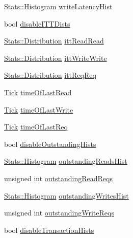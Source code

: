\begin{DoxyCompactItemize}
\item 
\hyperlink{classStats_1_1Histogram}{Stats::Histogram} \hyperlink{structCommMonitor_1_1MonitorStats_aae98c6b524c57e5bcbfdec4726032ba8}{writeLatencyHist}
\item 
bool \hyperlink{structCommMonitor_1_1MonitorStats_ad5c356c37130132a5d8a44e7020d7bb1}{disableITTDists}
\item 
\hyperlink{classStats_1_1Distribution}{Stats::Distribution} \hyperlink{structCommMonitor_1_1MonitorStats_a2898ccf55e5b25e410b8f90553212a71}{ittReadRead}
\item 
\hyperlink{classStats_1_1Distribution}{Stats::Distribution} \hyperlink{structCommMonitor_1_1MonitorStats_a6195d4cdad35fc6c4a2c2339ae3f633a}{ittWriteWrite}
\item 
\hyperlink{classStats_1_1Distribution}{Stats::Distribution} \hyperlink{structCommMonitor_1_1MonitorStats_a2534f8cd715e5bc6e07e14f9727428eb}{ittReqReq}
\item 
\hyperlink{base_2types_8hh_a5c8ed81b7d238c9083e1037ba6d61643}{Tick} \hyperlink{structCommMonitor_1_1MonitorStats_a6a581354c5e19eb4e16589d9806fef66}{timeOfLastRead}
\item 
\hyperlink{base_2types_8hh_a5c8ed81b7d238c9083e1037ba6d61643}{Tick} \hyperlink{structCommMonitor_1_1MonitorStats_a330664f7391bb348fd6f6e13d22aef26}{timeOfLastWrite}
\item 
\hyperlink{base_2types_8hh_a5c8ed81b7d238c9083e1037ba6d61643}{Tick} \hyperlink{structCommMonitor_1_1MonitorStats_a2f696df4ccf909e9eb168f897708cbbe}{timeOfLastReq}
\item 
bool \hyperlink{structCommMonitor_1_1MonitorStats_a58fa22f2c5716fcf2e67cfdfb9ccfb24}{disableOutstandingHists}
\item 
\hyperlink{classStats_1_1Histogram}{Stats::Histogram} \hyperlink{structCommMonitor_1_1MonitorStats_a16c997bc474fee7fff61f3716aa5792d}{outstandingReadsHist}
\item 
unsigned int \hyperlink{structCommMonitor_1_1MonitorStats_aa930889353c38227127f1f7a7945aa62}{outstandingReadReqs}
\item 
\hyperlink{classStats_1_1Histogram}{Stats::Histogram} \hyperlink{structCommMonitor_1_1MonitorStats_a4fef3195bdb93fcbb46f1bac89c3b2ef}{outstandingWritesHist}
\item 
unsigned int \hyperlink{structCommMonitor_1_1MonitorStats_ae09e25ada6f50f5e741ba4f7bd3de2ce}{outstandingWriteReqs}
\item 
bool \hyperlink{structCommMonitor_1_1MonitorStats_ab8f91b70ae09ec94249a1bb50adeba3f}{disableTransactionHists}

\end{DoxyCompactItemize}
